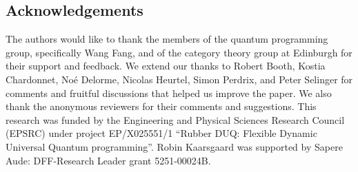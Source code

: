 \documentclass[a4paper]{article}
\theoremstyle{plain}
\theoremstyle{definition}
\begin{document}
\subsection*{Acknowledgements}

The authors would like to thank the members of the quantum programming group,
specifically Wang Fang, and of the category theory group at Edinburgh for their
support and feedback. We extend our thanks to Robert Booth, Kostia Chardonnet,
Noé Delorme, Nicolas Heurtel, Simon Perdrix, and Peter Selinger for comments
and fruitful discussions that helped us improve the paper. We also thank the
anonymous reviewers for their comments and suggestions. This research was
funded by the Engineering and Physical Sciences Research Council (EPSRC) under
project EP/X025551/1 “Rubber DUQ: Flexible Dynamic Universal Quantum
programming”. Robin Kaarsgaard was supported by Sapere Aude: DFF-Research
Leader grant 5251-00024B.






\appendix
\onecolumn


\end{document}
